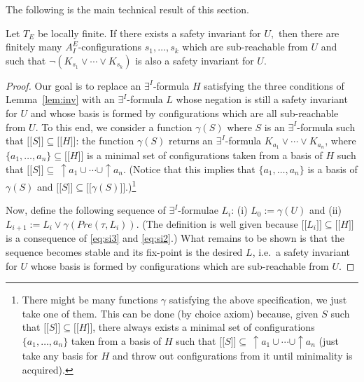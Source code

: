 \documentclass{LMCS}
\newcommand{\mywidehat}[1]{\ensuremath{\lbrack\!\lbrack #1 \rbrack\!\rbrack}}
\theoremstyle{plain}\newtheorem{assumption}[thm]{Assumption}
\theoremstyle{plain}\newtheorem{proposition}[thm]{Proposition}
\theoremstyle{plain}\newtheorem{property}[thm]{Property}
\theoremstyle{plain}\newtheorem{example}[thm]{Example}
\theoremstyle{plain}\newtheorem{claim}[thm]{Claim}
\theoremstyle{plain}\newtheorem{lemma}[thm]{Lemma}
\begin{document}
The following is the main technical result of this section.
\begin{thm}
  \label{th:inv}
  Let $T_E$ be locally finite.  If there exists a safety invariant for
  $U,$ then there are finitely many $A_I^E$-configurations $s_1,
  \dots, s_k$ which are sub-reachable from $U$ and such that $\neg
  (K_{s_1}\vee\cdots\vee K_{s_k})$ is also a safety invariant for $U$.
\end{thm}
\begin{proof}
  Our goal is to replace an $\exists^I$-formula $H$ satisfying the
  three conditions of Lemma~\ref{lem:inv} with an $\exists^I$-formula
  $L$ whose negation is still a safety invariant for $U$ and whose
  basis is formed by configurations which are all sub-reachable from
  $U$.  To this end, we consider a function $\gamma(S)$ where $S$ is
  an $\exists^I$-formula such that $\mywidehat{S}\subseteq
  \mywidehat{H}$: the function $\gamma(S)$ returns an
  $\exists^I$-formula $K_{a_1}\vee\cdots\vee K_{a_n}$, where $\{a_1,
  \dots, a_n\}\subseteq \mywidehat{H}$ is a minimal set of
  configurations taken from a basis of $H$ such that
  $\mywidehat{S}\subseteq\,\uparrow\! a_1\cup \cdots \cup \uparrow\!
  a_n$.  (Notice that this implies that $\{a_1, \dots, a_n\}$ is a
  basis of $\gamma(S)$ and $\mywidehat{S}\subseteq
  \mywidehat{\gamma(S)}$.)\footnote{There might be many functions
    $\gamma$ satisfying the above specification, we just take one of
    them.  This can be done (by choice axiom) because, given $S$ such
    that $\mywidehat{S}\subseteq \mywidehat{H}$, there always exists a
    minimal set of configurations $\{a_1, \dots, a_n\}$ taken from a
    basis of $H$ such that $\mywidehat{S}\subseteq\,\uparrow\! a_1\cup
    \cdots \cup \uparrow\!  a_n$ (just take any basis for $H$ and
    throw out configurations from it until minimality is acquired).  }

  Now, define the following sequence of $\exists^I$-formulae $L_i$:
  (i) $L_0:=\gamma(U)$ and (ii) $L_{i+1}:= L_i\vee \gamma(Pre(\tau,
  L_i))$.  (The definition is well given because
  $\mywidehat{L_i}\subseteq \mywidehat{H}$ is a consequence of
  \eqref{eq:si3} and \eqref{eq:si2}.)  What remains to be shown is
  that the sequence becomes stable and its fix-point is the desired
  $L$, i.e.\ a safety invariant for $U$ whose basis is formed by
  configurations which are sub-reachable from $U$.


\end{proof}
\end{document}
